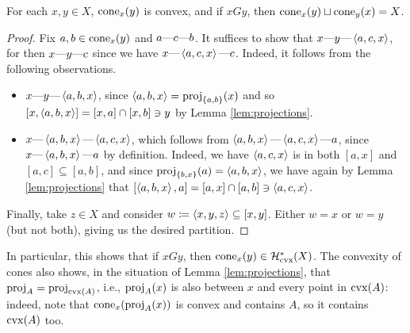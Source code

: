 \documentclass[reqno]{amsart}
\begin{document}
    \begin{lemma}\label{lem:cones_are_convex}
        For each $x,y\in X$, $\cone_x(y)$ is convex, and if $xGy$, then $\cone_x(y)\sqcup\cone_y(x)=X$.
    \end{lemma}
    \begin{proof}
        Fix $a,b\in\cone_x(y)$ and $a\-c\-b$. It suffices to show that $x\-y\-\l\langle a,c,x\r\rangle$, for then $x\-y\-c$ since we have $x\-\l\langle a,c,x\r\rangle\-c$. Indeed, it follows from the following observations.
        \begin{itemize}
            \item $x\-y\-\l\langle a,b,x\r\rangle$, since $\l\langle a,b,x\r\rangle=\proj_{\l\{a,b\r\}}(x)$ and so $[x,\l\langle a,b,x\r\rangle]=[x,a]\cap[x,b]\ni y$ by Lemma \ref{lem:projections}.
            \item $x\-\l\langle a,b,x\r\rangle\-\l\langle a,c,x\r\rangle$, which follows from $\l\langle a,b,x\r\rangle\-\l\langle a,c,x\r\rangle\-a$, since $x\-\l\langle a,b,x\r\rangle\-a$ by definition. Indeed, we have $\l\langle a,c,x\r\rangle$ is in both $[a,x]$ and $[a,c]\subseteq[a,b]$, and since $\proj_{\l\{b,x\r\}}(a)=\l\langle a,b,x\r\rangle$, we have again by Lemma \ref{lem:projections} that $[\l\langle a,b,x\r\rangle,a]=[a,x]\cap[a,b]\ni\l\langle a,c,x\r\rangle$.
        \end{itemize}
        Finally, take $z\in X$ and consider $w\coloneqq\l\langle x,y,z\r\rangle\subseteq[x,y]$. Either $w=x$ or $w=y$ (but not both), giving us the desired partition.
    \end{proof}

    \begin{remark}\label{rem:projection_between_point_in_convex}
        In particular, this shows that if $xGy$, then $\cone_x(y)\in\mc{H}^\ast_\mathrm{cvx}(X)$. The convexity of cones also shows, in the situation of Lemma \ref{lem:projections}, that $\proj_A=\proj_{\cvx(A)}$, i.e., $\proj_A(x)$ is also between $x$ and every point in $\cvx(A)$: indeed, note that $\cone_x(\proj_A(x))$ is convex and contains $A$, so it contains $\cvx(A)$ too.
    \end{remark}
\end{document}
